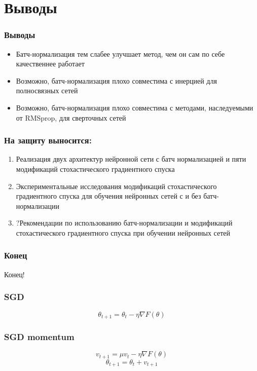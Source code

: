 \documentclass{beamer}
\begin{document}
\section{Выводы}

\begin{frame}
	\frametitle{Выводы}
\begin{itemize}
\item Батч-нормализация тем слабее улучшает метод, чем он сам по себе качественнее работает
\item Возможно, батч-нормализация плохо совместима с инерцией для полносвязных сетей
\item Возможно, батч-нормализация плохо совместима с методами, наследуемыми от RMSprop, для сверточных сетей
\end{itemize}
\end{frame}



\begin{frame}
\frametitle{На защиту выносится:}
\begin{enumerate}
\item Реализация двух архитектур нейронной сети с батч нормализацией и пяти модификаций стохастического градиентного спуска
\item Экспериментальные исследования модификаций стохастического градиентного спуска для обучения нейронных сетей с и без батч-нормализации
\item ?Рекомендации по использованию батч-нормализации и модификаций стохастического градиентного спуска при обучении нейронных сетей
\end{enumerate}
\end{frame}

\begin{frame}
	\frametitle{Конец}
\begin{center}
Конец!
\end{center}

\end{frame}



\begin{frame}
\frametitle{SGD}
\[\theta_{t+1} = \theta_t - \eta \nabla F(\theta)\]	
\end{frame}

\begin{frame}
\frametitle{SGD momentum}
\[v_{t+1} = \mu v_t - \eta \nabla F(\theta)\]
\[\theta_{t+1} = \theta_t + v_{t+1}\]	
\end{frame}
\end{document}
